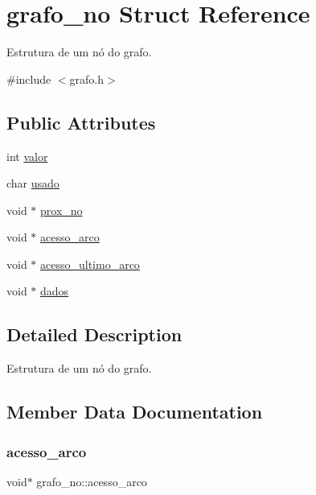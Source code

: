 \hypertarget{structgrafo__no}{}\section{grafo\+\_\+no Struct Reference}
\label{structgrafo__no}


Estrutura de um nó do grafo.  




{\ttfamily \#include $<$grafo.\+h$>$}

\subsection*{Public Attributes}
\begin{DoxyCompactItemize}
\item 
int \hyperlink{structgrafo__no_a3ee401d6586b9c2970238b4b15f17c1a}{valor}
\item 
char \hyperlink{structgrafo__no_a9495603502962604f64002d5250d7480}{usado}
\item 
void $\ast$ \hyperlink{structgrafo__no_a32b2d0f02b4f172a9a2bc4e07ee31e70}{prox\+\_\+no}
\item 
void $\ast$ \hyperlink{structgrafo__no_a8946f7b8d2a47d033b77305c26ea7814}{acesso\+\_\+arco}
\item 
void $\ast$ \hyperlink{structgrafo__no_a22d1b433f2702951eaf789d92e9894ac}{acesso\+\_\+ultimo\+\_\+arco}
\item 
void $\ast$ \hyperlink{structgrafo__no_a7bb9dee4390b93063ad3afebd9398310}{dados}
\end{DoxyCompactItemize}


\subsection{Detailed Description}
Estrutura de um nó do grafo. 

\subsection{Member Data Documentation}
\mbox{\label{structgrafo__no_a8946f7b8d2a47d033b77305c26ea7814}} 
\subsubsection{\texorpdfstring{acesso\+\_\+arco}{acesso\_arco}}
{\footnotesize\ttfamily void$\ast$ grafo\+\_\+no\+::acesso\+\_\+arco}

